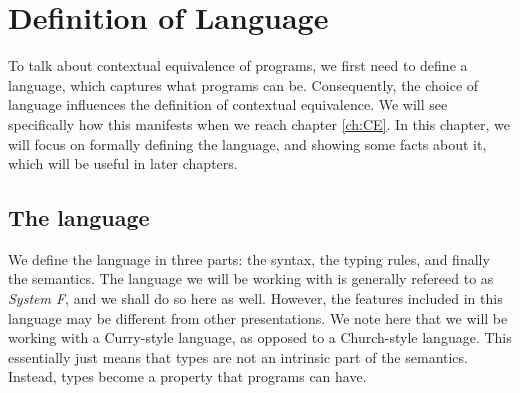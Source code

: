 \documentclass[twoside,11pt,openright]{report}
\theoremstyle{definition}
\begin{document}
\chapter{Definition of Language}
\label{ch:DoL}
To talk about contextual equivalence of programs, we first need to define a language, which captures what programs can be. Consequently, the choice of language influences the definition of contextual equivalence. We will see specifically how this manifests when we reach chapter \ref{ch:CE}. In this chapter, we will focus on formally defining the language, and showing some facts about it, which will be useful in later chapters.
\section{The language}
We define the language in three parts: the syntax, the typing rules, and finally the semantics. The language we will be working with is generally refereed to as \textit{System F}, and we shall do so here as well. However, the features included in this language may be different from other presentations. We note here that we will be working with a Curry-style language, as opposed to a Church-style language. This essentially just means that types are not an intrinsic part of the semantics. Instead, types become a property that programs can have.
\end{document}
